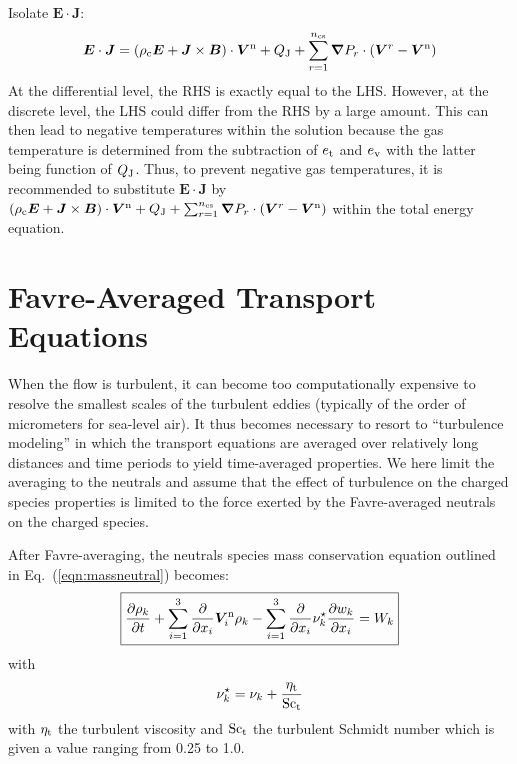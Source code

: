 \documentclass{warpdoc}
\newcommand\frameeqn[1]{\fbox{$\displaystyle #1$}}
\newcommand{\ncs}{{n_{\rm cs}}}
\newcommand{\visc}{\eta}
\renewcommand{\vec}[1]{\bm{#1}}
\begin{document}
%
Isolate $\vec{E}\cdot\vec{J}$:
%
\begin{equation}
\vec{E} \cdot \vec{J}
=
 \left(\rho_{\rm c} \vec{E} + \vec{J}\times\vec{B} \right)\cdot \vec{V}^{\rm n}
+ Q_{\rm J} 
+  \sum_{r=1}^\ncs \vec{\nabla} P_r \cdot \left(\vec{V}^r-\vec{V}^{\rm n}\right) 
\end{equation}
%
At the differential level, the RHS is exactly equal to the LHS. However, at the discrete level, the LHS could differ from the RHS by a large amount. This can then lead to negative temperatures within the solution because the gas temperature is determined from the subtraction of $e_{\rm t}$ and $e_{\rm v}$ with the latter being function of $Q_{\rm J}$. Thus, to prevent negative gas temperatures, it is recommended to substitute $\vec{E}\cdot\vec{J}$ by $\left(\rho_{\rm c} \vec{E} + \vec{J}\times\vec{B} \right)\cdot \vec{V}^{\rm n}
+ Q_{\rm J} +  \sum_{r=1}^\ncs \vec{\nabla} P_r \cdot \left(\vec{V}^r-\vec{V}^{\rm n}\right)$ within the total energy equation.











\section{Favre-Averaged Transport Equations}

When the flow is turbulent, it can become too computationally expensive to resolve the smallest scales of the turbulent eddies (typically of the order of micrometers for sea-level air). It thus becomes necessary to resort to ``turbulence modeling'' in which the transport equations are averaged over relatively long distances and time periods to yield time-averaged properties. We here limit the averaging to the neutrals and assume that the effect of turbulence on the charged species properties is limited to the force exerted by the Favre-averaged neutrals on the charged species. 

After Favre-averaging, the neutrals species mass conservation equation outlined in Eq.\ (\ref{eqn:massneutral}) becomes:
%
\begin{equation}
\frameeqn{
  \frac{\partial \rho_k}{\partial t} + \sum_{i=1}^3 \frac{\partial}{\partial x_i} \vec{V}_i^{\rm n} \rho_k 
- \sum_{i=1}^3 \frac{\partial}{\partial x_i} \nu_k^\star \frac{\partial w_k}{\partial x_i}= W_k
}
\label{eqn:massneutral_turb}
\end{equation}
%
with
%
\begin{equation}
  \nu_k^\star=\nu_k +\frac{\visc_{\rm t}}{{\rm Sc_t}}
\end{equation}
%
with $\visc_{\rm t}$ the turbulent viscosity and $\rm Sc_t$ the turbulent Schmidt number which is given a value ranging from 0.25 to 1.0.
\end{document}
